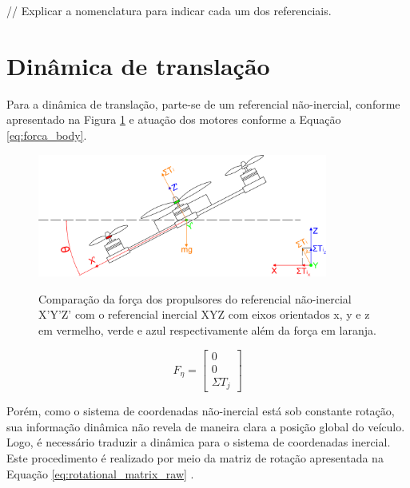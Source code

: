 \documentclass[main.tex]{subfiles}
\begin{document}
\textcolor{corrigir}{// Explicar a nomenclatura para indicar cada um dos referenciais.}

\section{Dinâmica de translação}

Para a dinâmica de translação, parte-se de um referencial não-inercial, conforme apresentado na Figura \ref{fig:ref_frame} e atuação dos motores conforme a Equação \ref{eq:forca_body}.

\begin{figure}[!h]
    \centering
    \caption{Comparação da força dos propulsores do referencial não-inercial X'Y'Z' com o referencial inercial XYZ com eixos orientados x, y e z em vermelho, verde e azul respectivamente além da força em laranja.}
    \includegraphics[width=0.85\textwidth]{capitulos/modelagem/imgs/ref_frame.png}
    \label{fig:ref_frame}
\end{figure}

\begin{equation}\label{eq:forca_body}
    F_\eta = \begin{bmatrix}
        0\\
        0\\
        \Sigma T_j
    \end{bmatrix}
\end{equation}

Porém, como o sistema de coordenadas não-inercial está sob constante rotação, sua informação dinâmica não revela de maneira clara a posição global do veículo. Logo, é necessário traduzir a dinâmica para o sistema de coordenadas inercial. Este procedimento é realizado por meio da matriz de rotação apresentada na Equação \ref{eq:rotational_matrix_raw} \cite{robotica}.
\end{document}
